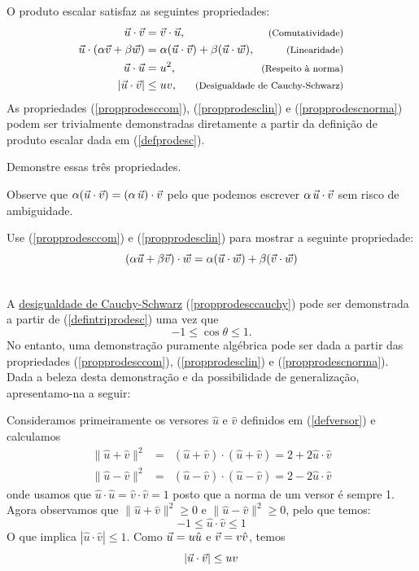O produto escalar satisfaz as seguintes propriedades:
\begin{subequations}\label{proprodesc}
\begin{align}
\vct{u}\cdot\vct{v}&=\vct{v}\cdot\vct{u},&\mytext{(Comutatividade)}\label{propprodesccom}\\
\vct{u}\cdot\left(\alpha\vct{v}+\beta \vct{w}\right)&=\alpha(\vct{u}\cdot\vct{v})+\beta(\vct{u}\cdot\vct{w}),\hspace{-5cm}&\mytext{(Linearidade)}\label{propprodesclin}\\
\vct{u}\cdot\vct{u}&=u^2,&\mytext{(Respeito à norma)}\label{propprodescnorma}\\
\left|\vct{u}\cdot\vct{v}\right|&\leq uv,&\mytext{(Desigualdade de Cauchy-Schwarz)}\label{propprodesccauchy}
\end{align}
\end{subequations}
As propriedades (\ref{propprodesccom}), (\ref{propprodesclin}) e (\ref{propprodescnorma}) podem ser trivialmente demonstradas diretamente a partir da definição de produto escalar dada em (\ref{defprodesc}).
\begin{prob} Demonstre essas três propriedades.
\end{prob}
Observe que $\alpha(\vec{u}\cdot\vec{v})=(\alpha~\!\vec{u})\cdot\vec{v}$ pelo que podemos escrever $\alpha~\!\vec{u}\cdot\vec{v}$ sem risco de ambiguidade.  
\begin{prob} Use (\ref{propprodesccom}) e  (\ref{propprodesclin}) para mostrar a seguinte propriedade:
$$
\left(\alpha\vec{u}+\beta \vec{v}\right)\cdot \vec{w}=\alpha (\vec{u}\cdot\vec{w})+ \beta (\vec{v}\cdot\vec{w})
$$

\end{prob}
~~ \\

A \underline{desigualdade de Cauchy-Schwarz} (\ref{propprodesccauchy}) pode ser demonstrada a partir de (\ref{defintriprodesc}) uma vez que $$-1\leq \cos\theta \leq 1.$$
No entanto, uma demonstração puramente algébrica pode ser dada a partir das propriedades (\ref{propprodesccom}), (\ref{propprodesclin}) e (\ref{propprodescnorma}). Dada a beleza desta demonstração e da possibilidade de generalização, apresentamo-na a seguir:

Consideramos primeiramente os versores $\hat{u}$ e $\hat{v}$ definidos em (\ref{defversor}) e calculamos
\begin{eqnarray*}
\|\hat{u}+\hat{v}\|^2 &=& \left(\hat{u}+\hat{v}\right)\cdot \left(\hat{u}+\hat{v}\right) = 2+2\hat{u}\cdot\hat{v} \\
\|\hat{u}-\hat{v}\|^2 &=& \left(\hat{u}-\hat{v}\right)\cdot \left(\hat{u}-\hat{v}\right) = 2-2\hat{u}\cdot\hat{v} 
\end{eqnarray*}
onde usamos que $\hat{u}\cdot\hat{u}=\hat{v}\cdot\hat{v}=1$ posto que a norma de um versor é sempre 1. Agora observamos que $\|\hat{u}+\hat{v}\|^2\geq 0 $ e $\|\hat{u}-\hat{v}\|^2\geq 0 $, pelo que temos:
$$-1\leq \hat{u}\cdot\hat{v} \leq 1$$
O que implica $|\hat{u}\cdot\hat{v}|\leq 1$. Como $\vec{u}=u\hat{u} $ e $\vec{v}=v\hat{v}$, temos
$$|\vec{u}\cdot\vec{v}|\leq uv$$ 

